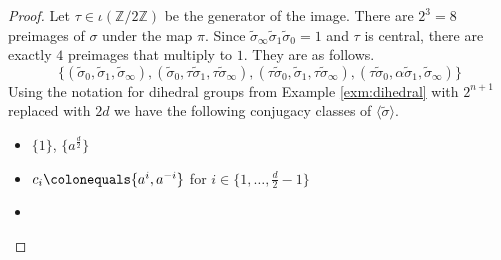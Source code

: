\documentclass{dcthesis}
\newcommand{\ZZ}{\mathbb Z}
\newcommand{\wt}[1]{\widetilde{#1}}
\numberwithin{equation}{section}
\theoremstyle{definition}
\theoremstyle{remark}
\begin{document}
{{{\begin{proof}
      Let $\tau\in\iota(\ZZ/2\ZZ)$
      be the generator of the image.
      There are $2^3 = 8$ preimages of $\sigma$
      under the map $\pi$.
      Since $\wt{\sigma}_\infty
      \wt{\sigma}_1\wt{\sigma}_0=1$
      and $\tau$ is central,
      there are exactly $4$ preimages
      that multiply to $1$.
      They are as follows.
      \begin{equation}
        \label{eqn:preimagesto1}
        \{
          (\wt{\sigma}_0,\wt{\sigma}_1,\wt{\sigma}_\infty),
          (\wt{\sigma}_0,\tau\wt{\sigma}_1,\tau\wt{\sigma}_\infty),
          (\tau\wt{\sigma}_0,\wt{\sigma}_1,\tau\wt{\sigma}_\infty),
          (\tau\wt{\sigma}_0,\alpha\wt{\sigma}_1,\wt{\sigma}_\infty)
        \}
      \end{equation}
      Using the notation for dihedral groups
      from Example \ref{exm:dihedral}
      with $2^{n+1}$ replaced with $2d$
      we have the following conjugacy classes
      of $\langle\wt{\sigma}\rangle$.
      \begin{itemize}
        \item
          $ \{1\} $,
          $ \{a^{\frac{d}{2}}\} $
        \item
          $c_i\colonequals \{a^i,a^{-i}\}$
          for $i\in \{1,\dots,\frac{d}{2}-1\}$
        \item

\end{itemize}
\end{proof}}}}
\end{document}
